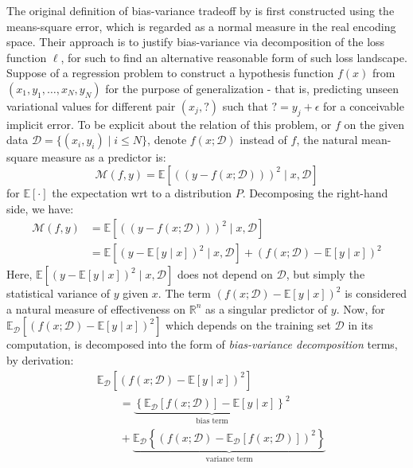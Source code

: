 \documentclass[
  journal=largetwo,
  year=2025,
  volume=37,
]{cup-journal}
\begin{document}
The original definition of bias-variance tradeoff by \cite{6797087} is first constructed using the means-square error, which is regarded as a normal measure in the real encoding space. Their approach is to justify bias-variance via decomposition of the loss function $\ell$, for such to find an alternative reasonable form of such loss landscape. Suppose of a regression problem to construct a hypothesis function $f(x)$ from $(x_{1},y_{1},\dots,x_{N},y_{N})$ for the purpose of generalization - that is, predicting unseen variational values for different pair $(x_{j}, \mathord{?})$ such that $\mathord{?}=y_{j}+\epsilon$ for a conceivable implicit error. To be explicit about the relation of this problem, or $f$ on the given data $\mathcal{D}=\{(x_i, y_i)\mid i \leq N\}$, denote $f(x;\mathcal{D})$ instead of $f$, the natural mean-square measure as a predictor is: 
\begin{equation}
    \mathcal{M}(f,y) = \mathbb{E} \left[((y-f(x;\mathcal{D})))^{2}\mid x, \mathcal{D}\right] 
\end{equation} for $\mathbb{E}[\cdot]$ the expectation wrt to a distribution $P$. Decomposing the right-hand side, we have: 
\begin{equation}
    \begin{split}
        \mathcal{M}(f,y) &= \mathbb{E} \left[((y-f(x;\mathcal{D})))^{2}\mid x, \mathcal{D}\right] \\
        &= \mathbb{E}\left[(y-\mathbb{E}[y\mid x])^{2}\mid x,\mathcal{D}\right] + (f(x;\mathcal{D})-\mathbb{E}[y\mid x])^{2}
    \end{split}
\end{equation}
Here, $\mathbb{E}\left[(y-\mathbb{E}[y\mid x])^{2}\mid x,\mathcal{D}\right]$ does not depend on $\mathcal{D}$, but simply the statistical variance of $y$ given $x$. The term $(f(x;\mathcal{D})-\mathbb{E}[y\mid x])^{2}$ is considered a natural measure of effectiveness on $\mathbb{R}^{n}$ as a singular predictor of $y$. Now, for $\mathbb{E}_{\mathcal{D}}\left[(f(x;\mathcal{D})-\mathbb{E}[y\mid x])^{2}\right]$ which depends on the training set $\mathcal{D}$ in its computation, is decomposed into the form of \textit{bias-variance decomposition} terms, by derivation: 
\begin{equation}
    \begin{split}
        &\mathbb{E}_{\mathcal{D}} \left[(f(x;\mathcal{D})-\mathbb{E}[y\mid x])^{2}\right] \\
        &\quad \quad = \underbrace{\left\{ \mathbb{E}_{\mathcal{D}}[f(x;\mathcal{D})] - \mathbb{E}[y\mid x] \right\}^{2}}_{\text{bias term}} \\
        &\quad\quad + \underbrace{\mathbb{E}_{\mathcal{D}} \left\{(f(x;\mathcal{D})- \mathbb{E}_{\mathcal{D}}[f(x;\mathcal{D})])^{2}\right\}}_{\text{variance term}}
    \end{split}
\end{equation}
\end{document}
